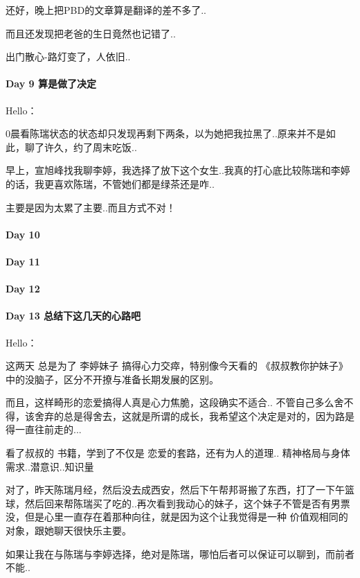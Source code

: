 \documentclass[UTF8,a4paper,8pt]{ctexbook}
\begin{document}
	 	 还好，晚上把PBD的文章算是翻译的差不多了..
	 	 
		 而且还发现把老爸的生日竟然也记错了..
		 
		 出门散心-路灯变了，人依旧..
 	 \paragraph{Day 9   算是做了决定    \quad     }
	 	 Hello：
	 	 
	 	 0晨看陈瑞状态的状态却只发现再剩下两条，以为她把我拉黑了..原来并不是如此，聊了许久，约了周末吃饭..
	 	 
	 	 早上，宣旭峰找我聊李婷，我选择了放下这个女生..我真的打心底比较陈瑞和李婷的话，我更喜欢陈瑞，不管她们都是绿茶还是咋..
	 	 
	 	 主要是因为太累了主要..而且方式不对！
 	 \paragraph{Day 10      \quad     }
 	 \paragraph{Day 11      \quad     }
 	 \paragraph{Day 12      \quad     }
 	 \paragraph{Day 13  总结下这几天的心路吧    \quad     }
	 	 Hello：
	 	 
	 	 这两天 总是为了 李婷妹子 搞得心力交瘁，特别像今天看的 《叔叔教你护妹子》 中的没脑子，区分不开撩与准备长期发展的区别。
	 	 
	 	 而且，这样畸形的恋爱搞得人真是心力焦脆，这段确实不适合.. 不管自己多么舍不得，该舍弃的总是得舍去，这就是所谓的成长，我希望这个决定是对的，因为路是得一直往前走的...
	 	 
	 	 看了叔叔的 书籍，学到了不仅是 恋爱的套路，还有为人的道理.. 精神格局与身体需求..潜意识..知识量
	 	 
	 	 对了，昨天陈瑞月经，然后没去成西安，然后下午帮邦哥搬了东西，打了一下午篮球，然后回来帮陈瑞买了吃的..再次看到我动心的妹子，这个妹子不管是否有男票没，但是心里一直存在着那种向往，就是因为这个让我觉得是一种 价值观相同的 对象，跟她聊天很快乐主要。
	 	 
	 	 如果让我在与陈瑞与李婷选择，绝对是陈瑞，哪怕后者可以保证可以聊到，而前者不能..
	 	 
\end{document}
